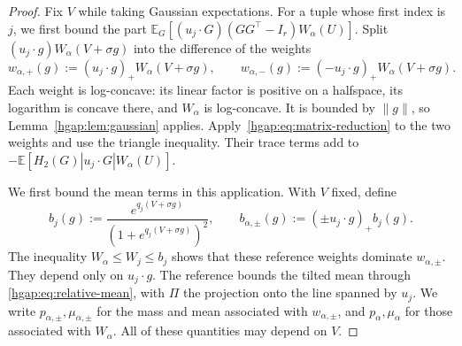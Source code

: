 \documentclass[11pt,letterpaper]{article}
\theoremstyle{remark}
\newcommand{\E}{\mathbb E}
\begin{document}
\begin{proof}
Fix $V$ while taking Gaussian expectations. For a tuple whose first
index is $j$, we first bound the part
$\E_G[(u_j\cdot G)(GG^\top-I_r)W_\alpha(U)]$.
Split $(u_j\cdot g)W_\alpha(V+\sigma g)$ into the difference of the weights
\[
 w_{\alpha,+}(g):=(u_j\cdot g)_+W_\alpha(V+\sigma g),\qquad
 w_{\alpha,-}(g):=(-u_j\cdot g)_+W_\alpha(V+\sigma g).
\]
Each weight is log-concave: its linear factor is positive on a
halfspace, its logarithm is concave there, and $W_\alpha$ is log-concave.
It is bounded by $\|g\|$, so Lemma~\ref{hgap:lem:gaussian} applies.
Apply~\eqref{hgap:eq:matrix-reduction} to the two weights and use the
triangle inequality. Their trace terms add to
$-\E[H_2(G)|u_j\cdot G|W_\alpha(U)]$.

We first bound the mean terms in this application. With $V$ fixed,
define
\[
 b_j(g):=\frac{e^{q_j(V+\sigma g)}}{(1+e^{q_j(V+\sigma g)})^2},
 \qquad b_{\alpha,\pm}(g):=(\pm u_j\cdot g)_+b_j(g).
\]
The inequality $W_\alpha\le W_j\le b_j$ shows that these reference
weights dominate $w_{\alpha,\pm}$. They depend only on $u_j\cdot g$.
The reference bounds the tilted mean through
\eqref{hgap:eq:relative-mean}, with $\Pi$ the projection onto the line
spanned by $u_j$. We write $p_{\alpha,\pm},\mu_{\alpha,\pm}$ for the
mass and mean associated with $w_{\alpha,\pm}$, and
$p_\alpha,\mu_\alpha$ for those associated with $W_\alpha$.
All of these quantities may depend on $V$.


\end{proof}
\end{document}
